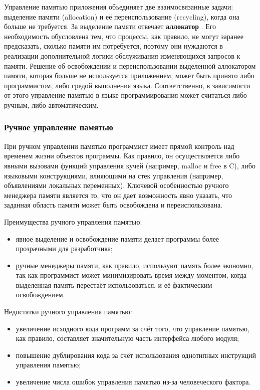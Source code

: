 Управление памятью приложения объединяет две взаимосвязанные задачи: выделение памяти (allocation) и её переиспользование (recycling), когда она больше не требуется. За выделение памяти отвечает \textbf{аллокатор} \cite{allocator}. Его необходимость обусловлена тем, что процессы, как правило, не могут заранее предсказать, сколько памяти им потребуется, поэтому они нуждаются в реализации дополнительной логики обслуживания изменяющихся запросов к памяти. Решение об освобождении и переиспользовании выделенной аллокатором памяти, которая больше не используется приложением, может быть принято либо программистом, либо средой выполнения языка. Соответственно, в зависимости от этого управление памятью в языке программирования может считаться либо ручным, либо автоматическим.

\subsubsection{Ручное управление памятью}

При ручном управлении памятью программист имеет прямой контроль над временем жизни объектов программы. Как правило, он осуществляется либо явными вызовами функций управления кучей (например, malloc и free в C), либо языковыми конструкциями, влияющими на стек управления (например, объявлениями локальных переменных). Ключевой особенностью ручного менеджера памяти является то, что он дает возможность явно указать, что заданная область памяти может быть освобождена и переиспользована. \cite{mm_overview}

Преимущества ручного управления памятью: 

\begin{itemize}[label*=---]
	\item явное выделение и освобождение памяти делает программы более прозрачными для разработчика;
	\item ручные менеджеры памяти, как правило, используют память более экономно, так как программист может минимизировать время между моментом, когда выделенная память перестаёт использоваться, и её фактическим освобождением.
\end{itemize}

Недостатки ручного управления памятью: 

\begin{itemize}[label*=---]
	\item увеличение исходного кода программ за счёт того, что управление памятью, как правило, составляет значительную часть интерфейса любого модуля;
	\item повышение дублирования кода за счёт использования однотипных инструкций управления памятью;
	\item увеличение числа ошибок управления памятью из-за человеческого фактора.
\end{itemize}

